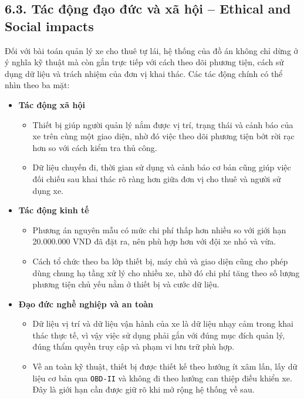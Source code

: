 \documentclass[a4paper]{extarticle}
\providecommand{\tightlist}{%
  \setlength{\itemsep}{0pt}\setlength{\parskip}{0pt}}
\begin{document}
\subsection{6.3. Tác động đạo đức và xã hội -- Ethical and Social impacts}\label{tuxe1c-ux111ux1ed9ng-ux111ux1ea1o-ux111ux1ee9c-vuxe0-xuxe3-hux1ed9i-ethical-and-social-impacts}

Đối với bài toán quản lý xe cho thuê tự lái, hệ thống của đồ án không chỉ dừng ở ý nghĩa kỹ thuật mà còn gắn trực tiếp với cách theo dõi phương tiện, cách sử dụng dữ liệu và trách nhiệm của đơn vị khai thác. Các tác động chính có thể nhìn theo ba mặt:

\begin{itemize}
\tightlist
\item
  \textbf{Tác động xã hội}

  \begin{itemize}
  \tightlist
  \item
    Thiết bị giúp người quản lý nắm được vị trí, trạng thái và cảnh báo của xe trên cùng một giao diện, nhờ đó việc theo dõi phương tiện bớt rời rạc hơn so với cách kiểm tra thủ công.
  \item
    Dữ liệu chuyến đi, thời gian sử dụng và cảnh báo cơ bản cũng giúp việc đối chiếu sau khai thác rõ ràng hơn giữa đơn vị cho thuê và người sử dụng xe.
  \end{itemize}
\item
  \textbf{Tác động kinh tế}

  \begin{itemize}
  \tightlist
  \item
    Phương án nguyên mẫu có mức chi phí thấp hơn nhiều so với giới hạn 20.000.000 VND đã đặt ra, nên phù hợp hơn với đội xe nhỏ và vừa.
  \item
    Cách tổ chức theo ba lớp thiết bị, máy chủ và giao diện cũng cho phép dùng chung hạ tầng xử lý cho nhiều xe, nhờ đó chi phí tăng theo số lượng phương tiện chủ yếu nằm ở thiết bị và cước dữ liệu.
  \end{itemize}
\item
  \textbf{Đạo đức nghề nghiệp và an toàn}

  \begin{itemize}
  \tightlist
  \item
    Dữ liệu vị trí và dữ liệu vận hành của xe là dữ liệu nhạy cảm trong khai thác thực tế, vì vậy việc sử dụng phải gắn với đúng mục đích quản lý, đúng thẩm quyền truy cập và phạm vi lưu trữ phù hợp.
  \item
    Về an toàn kỹ thuật, thiết bị được thiết kế theo hướng ít xâm lấn, lấy dữ liệu cơ bản qua \texttt{OBD-II} và không đi theo hướng can thiệp điều khiển xe. Đây là giới hạn cần được giữ rõ khi mở rộng hệ thống về sau.
  \end{itemize}
\end{itemize}
\end{document}
